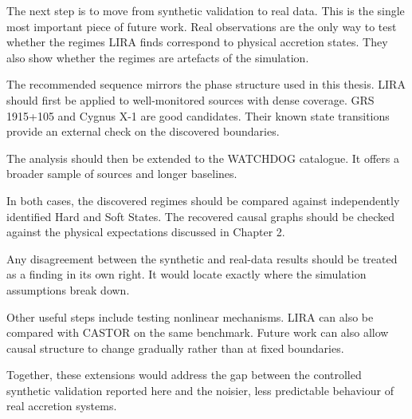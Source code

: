 The next step is to move from synthetic validation to real data. This is the single
most important piece of future work. Real observations are the only way to test
whether the regimes LIRA finds correspond to physical accretion states. They also
show whether the regimes are artefacts of the simulation.

The recommended sequence mirrors the phase structure used in this thesis. LIRA should
first be applied to well-monitored sources with dense coverage. GRS 1915+105 and
Cygnus X-1 are good candidates. Their known state transitions provide an external
check on the discovered boundaries.

The analysis should then be extended to the WATCHDOG catalogue. It offers a broader
sample of sources and longer baselines.

In both cases, the discovered regimes should be compared against independently
identified Hard and Soft States. The recovered causal graphs should be checked
against the physical expectations discussed in Chapter 2.

Any disagreement between the synthetic and real-data results should be treated as a
finding in its own right. It would locate exactly where the simulation assumptions
break down.

Other useful steps include testing nonlinear mechanisms. LIRA can also be compared
with CASTOR on the same benchmark. Future work can also allow causal structure to
change gradually rather than at fixed boundaries.

Together, these extensions would address the gap between the controlled synthetic
validation reported here and the noisier, less predictable behaviour of real
accretion systems.
